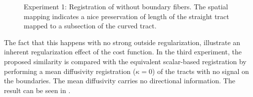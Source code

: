 \documentclass[twocolumn]{svjour3}
\begin{document}
\begin{figure}[!ht]
  \centering \vspace*{-0.4cm} 
  \hspace*{.5cm}
  \caption{Experiment 1: Registration of without boundary fibers. The spatial mapping
    indicates a nice preservation of length of the straight tract mapped to a subsection
    of the curved tract.}
  \label{fig:straight2wavy_l_boundary}
\end{figure}
The fact that this happens with no strong outside regularization, illustrate an inherent
regularization effect of the cost function.  In the third experiment, the proposed
similarity is compared with the equivalent scalar-based registration by performing a mean
diffusivity registration ($\kappa=0$) of the tracts with no signal on the boundaries. The
mean diffusivity carries no directional information. The result can be seen in
.
\end{document}
